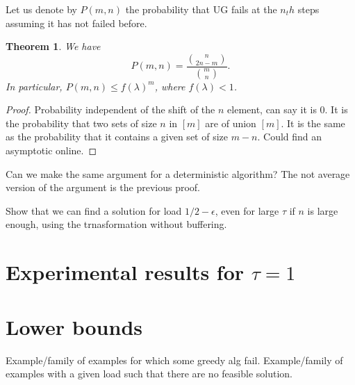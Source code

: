 \documentclass[10pt, conference, letterpaper]{IEEEtran}
\newtheorem{theorem}{Theorem}
\begin{document}
Let us denote by $P(m,n)$ the probability that UG fails at the $n_th$
steps assuming it has not failed before.

\begin{theorem}
We have $$P(m,n) = \frac{\binom{n}{2n-m}}{\binom{m}{n}}.$$
In particular, $P(m,n) \leq f(\lambda)^m$, where $f(\lambda) < 1$.
\end{theorem}
\begin{proof}
Probability independent of the shift of the $n$ element, can say it is $0$.
It is the probability that two sets of size $n$ in $[m]$ are of union $[m]$.
It is the same as the probability that it contains a given set of size $m-n$.
Could find an asymptotic online.
\end{proof}

Can we make the same argument for a deterministic algorithm?
The not average version of the argument is the previous proof.

Show that we can find a solution for load $1/2 - \epsilon$, even for large 
$\tau$ if $n$ is large enough, using the trnasformation without buffering.

\section{Experimental results for $\tau = 1$}


\section{Lower bounds}

Example/family of examples for which some greedy alg fail.
Example/family of examples with a given load such that there are no feasible solution.


 
\end{document}
